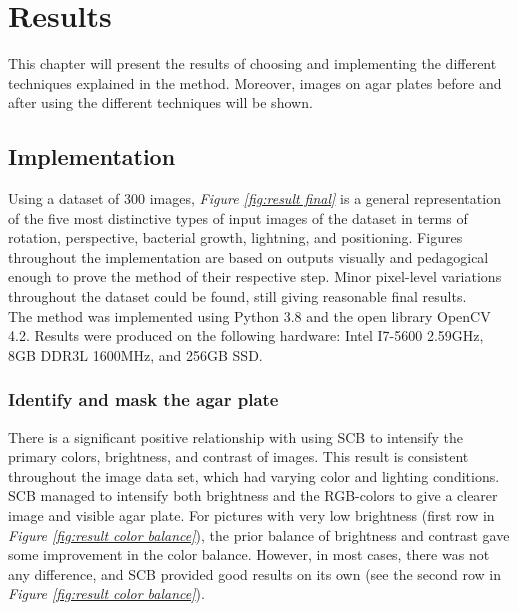 
\chapter{Results}
\label{cha:results}
This chapter will present the results of choosing and implementing the different techniques explained in the method. Moreover, images on agar plates before and after using the different techniques will be shown. 

\section{Implementation}
Using a dataset of 300 images, \textit{Figure \ref{fig:result final}} is a general representation of the five most distinctive types of input images of the dataset in terms of rotation, perspective, bacterial growth, lightning, and positioning. Figures throughout the implementation are based on outputs visually and pedagogical enough to prove the method of their respective step. Minor pixel-level variations throughout the dataset could be found, still giving reasonable final results. \\

\noindent The method was implemented using Python 3.8 and the open library OpenCV 4.2. Results were produced on the following hardware: Intel I7-5600 2.59GHz, 8GB DDR3L 1600MHz, and 256GB SSD.



\subsection{Identify and mask the agar plate}
\noindent There is a significant positive relationship with using SCB to intensify the primary colors, brightness, and contrast of images. This result is consistent throughout the image data set, which had varying color and lighting conditions. SCB managed to intensify both brightness and the RGB-colors to give a clearer image and visible agar plate. For pictures with very low brightness (first row in \textit{Figure \ref{fig:result color balance}}), the prior balance of brightness and contrast gave some improvement in the color balance. However, in most cases, there was not any difference, and SCB provided good results on its own (see the second row in \textit{Figure \ref{fig:result color balance}}). \\

